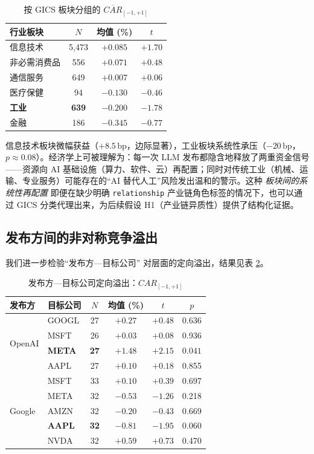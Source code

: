 \documentclass[11pt]{ctexart}
\begin{document}
\begin{table}[htbp]
\centering
\caption{按 GICS 板块分组的 $\overline{CAR}_{[-1,+1]}$}
\label{tab:industry_car}
\small
\begin{tabular}{lccc}
\toprule
行业板块 & $N$ & 均值 (\%) & $t$ \\
\midrule
信息技术   & 5{,}473 & $+0.085$ & $+1.70$ \\
非必需消费品 & 556 & $+0.071$ & $+0.48$ \\
通信服务   & 649 & $+0.007$ & $+0.06$ \\
医疗保健   & 94  & $-0.130$ & $-0.46$ \\
\textbf{工业} & \textbf{639} & $\mathbf{-0.200}$ & $\mathbf{-1.78}$ \\
金融      & 186 & $-0.345$ & $-0.77$ \\
\bottomrule
\end{tabular}
\end{table}

信息技术板块微幅获益（$+8.5\,\text{bp}$，边际显著），工业板块系统性承压（$-20\,\text{bp}$，$p\approx 0.08$）。经济学上可被理解为：每一次 LLM 发布都隐含地释放了两重资金信号——资源向 AI 基础设施（算力、软件、云）再配置；同时对传统工业（机械、运输、专业服务）可能存在的“AI 替代人工”风险发出温和的警示。这种 \emph{板块间的系统性再配置} 即便在缺少明确 \texttt{relationship} 产业链角色标签的情况下，也可以通过 GICS 分类代理出来，为后续假设 H1（产业链异质性）提供了结构化证据。

\subsection{发布方间的非对称竞争溢出}

我们进一步检验“发布方—目标公司” 对层面的定向溢出，结果见表 \ref{tab:pairwise}。

\begin{table}[htbp]
\centering
\caption{发布方—目标公司定向溢出：$CAR_{[-1,+1]}$}
\label{tab:pairwise}
\small
\begin{tabular}{llcccc}
\toprule
发布方 & 目标公司 & $N$ & 均值 (\%) & $t$ & $p$ \\
\midrule
\multirow{4}{*}{OpenAI}
 & GOOGL & 27 & $+0.27$ & $+0.48$ & 0.636 \\
 & MSFT  & 26 & $+0.03$ & $+0.08$ & 0.936 \\
 & \textbf{META}  & \textbf{27} & $\mathbf{+1.48}$ & $\mathbf{+2.15}$ & $\mathbf{0.041}$ \\
 & AAPL  & 27 & $+0.10$ & $+0.18$ & 0.855 \\
\midrule
\multirow{5}{*}{Google}
 & MSFT  & 33 & $+0.10$ & $+0.39$ & 0.697 \\
 & META  & 32 & $-0.53$ & $-1.26$ & 0.218 \\
 & AMZN  & 32 & $-0.20$ & $-0.43$ & 0.669 \\
 & \textbf{AAPL}  & \textbf{32} & $\mathbf{-0.81}$ & $\mathbf{-1.95}$ & $\mathbf{0.060}$ \\
 & NVDA  & 32 & $+0.59$ & $+0.73$ & 0.470 \\
\bottomrule
\end{tabular}
\end{table}
\end{document}
